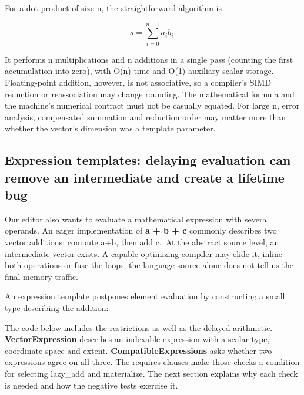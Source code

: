 For a dot product of size n, the straightforward algorithm is

\[
s=\sum_{i=0}^{n-1}a_i b_i.
\]

It performs n multiplications and n additions in a single pass (counting the first accumulation into zero), with O(n) time and O(1) auxiliary scalar storage. Floating-point addition, however, is not associative, so a compiler's SIMD reduction or reassociation may change rounding. The mathematical formula and the machine's numerical contract must not be casually equated. For large n, error analysis, compensated summation and reduction order may matter more than whether the vector's dimension was a template parameter.

\subsection{Expression templates: delaying evaluation can remove an intermediate and create a lifetime bug}\label{01-foundations-i-ch007-expression-templates-delaying-evaluation-can-remove-an-intermediate-and-create-a-lifetime-bug}

Our editor also wants to evaluate a mathematical expression with several operands. An eager implementation of \textbf{a + b + c} commonly describes two vector additions: compute a+b, then add c.~At the abstract source level, an intermediate vector exists. A capable optimizing compiler may elide it, inline both operations or fuse the loops; the language source alone does not tell us the final memory traffic.

An expression template postpones element evaluation by constructing a small type describing the addition:

The code below includes the restrictions as well as the delayed arithmetic. \textbf{VectorExpression} describes an indexable expression with a scalar type, coordinate space and extent. \textbf{CompatibleExpressions} asks whether two expressions agree on all three. The requires clauses make those checks a condition for selecting lazy\_add and materialize. The next section explains why each check is needed and how the negative tests exercise it.

